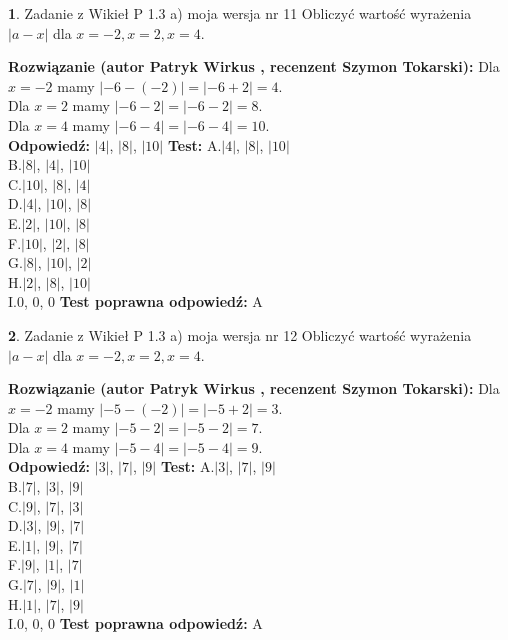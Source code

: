 \documentclass[12pt, a4paper]{article}
\theoremstyle{definition} %
\newtheorem{zad}{}
\newcommand{\zadStart}[1]{\begin{zad}#1\newline}
\newcommand{\zadStop}{\end{zad}}
\newcommand{\rozwStart}[2]{\noindent \textbf{Rozwiązanie (autor #1 , recenzent #2): }\newline}
\newcommand{\rozwStop}{\newline}
\newcommand{\odpStart}{\noindent \textbf{Odpowiedź:}\newline}
\newcommand{\odpStop}{\newline}
\newcommand{\testStart}{\noindent \textbf{Test:}\newline}
\newcommand{\testStop}{\newline}
\newcommand{\kluczStart}{\noindent \textbf{Test poprawna odpowiedź:}\newline}
\newcommand{\kluczStop}{\newline}
\begin{document}
\zadStart{Zadanie z Wikieł P 1.3 a) moja wersja nr 11}
Obliczyć wartość wyrażenia $|a - x|$ dla $x=-2,x=2,x=4$.
\zadStop
\rozwStart{Patryk Wirkus}{Szymon Tokarski}
Dla $x = -2$ mamy $|-6 - (-2)| = |-6 + 2| = 4$.\\
Dla $x = 2$ mamy $|-6 - 2| = |-6 - 2| = 8$.\\
Dla $x = 4$ mamy $|-6 - 4| = |-6 - 4| = 10$.\\
\rozwStop
\odpStart
$|4|$, $|8|$, $|10|$
\odpStop
\testStart
A.$|4|$, $|8|$, $|10|$\\
B.$|8|$, $|4|$, $|10|$\\
C.$|10|$, $|8|$, $|4|$\\
D.$|4|$, $|10|$, $|8|$\\
E.$|2|$, $|10|$, $|8|$\\
F.$|10|$, $|2|$, $|8|$\\
G.$|8|$, $|10|$, $|2|$\\
H.$|2|$, $|8|$, $|10|$\\
I.$0$, $0$, $0$
\testStop
\kluczStart
A
\kluczStop



\zadStart{Zadanie z Wikieł P 1.3 a) moja wersja nr 12}
Obliczyć wartość wyrażenia $|a - x|$ dla $x=-2,x=2,x=4$.
\zadStop
\rozwStart{Patryk Wirkus}{Szymon Tokarski}
Dla $x = -2$ mamy $|-5 - (-2)| = |-5 + 2| = 3$.\\
Dla $x = 2$ mamy $|-5 - 2| = |-5 - 2| = 7$.\\
Dla $x = 4$ mamy $|-5 - 4| = |-5 - 4| = 9$.\\
\rozwStop
\odpStart
$|3|$, $|7|$, $|9|$
\odpStop
\testStart
A.$|3|$, $|7|$, $|9|$\\
B.$|7|$, $|3|$, $|9|$\\
C.$|9|$, $|7|$, $|3|$\\
D.$|3|$, $|9|$, $|7|$\\
E.$|1|$, $|9|$, $|7|$\\
F.$|9|$, $|1|$, $|7|$\\
G.$|7|$, $|9|$, $|1|$\\
H.$|1|$, $|7|$, $|9|$\\
I.$0$, $0$, $0$
\testStop
\kluczStart
A
\kluczStop
\end{document}
